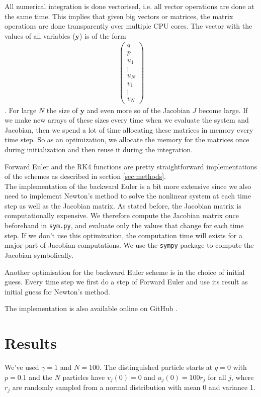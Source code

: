 \documentclass{article}
\newcommand{\vect}[1]{\boldsymbol{#1}}
\begin{document}
All numerical integration is done vectorised, i.e. all vector operations are done at the same time. This implies that given big vectors or matrices, the matrix operations are done transparently over multiple CPU cores. The vector with the values of all variables ($\vect{y}$) is of the form 
\begin{align*}
\begin{pmatrix}
q \\ p \\ u_1 \\ \vdots \\ u_N \\ v_1 \\ \vdots \\ v_N
\end{pmatrix}
\end{align*}.
For large $N$ the size of $\vect{y}$ and even more so of the Jacobian $J$ become large. If we make new arrays of these sizes every time when we evaluate the system and Jacobian, then we spend a lot of time allocating these matrices in memory every time step. So as an optimization, we allocate the memory for the matrices once during initialization and then reuse it during the integration.

Forward Euler and the RK4 functions are pretty straightforward implementations of the schemes as described in section \ref{sec:methods}.\\

 The implementation of the backward Euler is a bit more extensive since we also need to implement Newton's method to solve the nonlinear system at each time step as well as the Jacobian matrix. As stated before, the Jacobian matrix is computationally expensive. We therefore compute the Jacobian matrix once beforehand in \texttt{sym.py}, and evaluate only the values that change for each time step. If we don't use this optimization, the computation time will exists for a major part of Jacobian computations. We use the \texttt{sympy} package to compute the Jacobian symbolically.
 
Another optimisation for the backward Euler scheme is in the choice of initial guess. Every time step we first do a step of Forward Euler and use its result as initial guess for Newton's method.

The implementation is also available online on GitHub \cite{github}.

\section{Results}
We've used $\gamma=1$ and $N=100$. The distinguished particle starts at $q=0$ with $p=0.1$ and the $N$ particles have $v_j(0)=0$ and $u_j(0) = 100 r_j$ for all $j$, where $r_j$ are randomly sampled from a normal distribution with mean 0 and variance 1.
\end{document}
